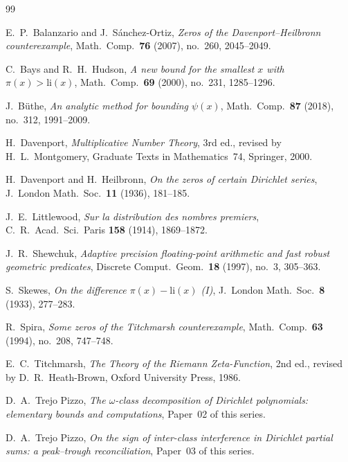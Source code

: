 \documentclass[11pt]{amsart}
\theoremstyle{definition}
\theoremstyle{remark}
\begin{document}
\begin{thebibliography}{99}

E.~P.\ Balanzario and J.~S\'anchez-Ortiz,
\emph{Zeros of the Davenport--Heilbronn counterexample},
Math.\ Comp.\ \textbf{76} (2007), no.\ 260, 2045--2049.

C.~Bays and R.~H.\ Hudson,
\emph{A new bound for the smallest $x$ with $\pi(x)>\mathrm{li}(x)$},
Math.\ Comp.\ \textbf{69} (2000), no.\ 231, 1285--1296.

J.~B\"uthe,
\emph{An analytic method for bounding $\psi(x)$},
Math.\ Comp.\ \textbf{87} (2018), no.\ 312, 1991--2009.

H.~Davenport,
\emph{Multiplicative Number Theory},
3rd ed., revised by H.~L.~Montgomery,
Graduate Texts in Mathematics~74, Springer, 2000.

H.~Davenport and H.~Heilbronn,
\emph{On the zeros of certain Dirichlet series},
J.\ London Math.\ Soc.\ \textbf{11} (1936), 181--185.

J.~E.\ Littlewood,
\emph{Sur la distribution des nombres premiers},
C.\ R.\ Acad.\ Sci.\ Paris \textbf{158} (1914), 1869--1872.

J.~R.\ Shewchuk,
\emph{Adaptive precision floating-point arithmetic and fast robust
geometric predicates},
Discrete Comput.\ Geom.\ \textbf{18} (1997), no.~3, 305--363.

S.~Skewes,
\emph{On the difference $\pi(x)-\mathrm{li}(x)$ (I)},
J.\ London Math.\ Soc.\ \textbf{8} (1933), 277--283.

R.~Spira,
\emph{Some zeros of the Titchmarsh counterexample},
Math.\ Comp.\ \textbf{63} (1994), no.\ 208, 747--748.

E.~C.\ Titchmarsh,
\emph{The Theory of the Riemann Zeta-Function},
2nd ed., revised by D.~R.~Heath-Brown,
Oxford University Press, 1986.

D.~A.\ Trejo Pizzo,
\emph{The $\omega$-class decomposition of Dirichlet polynomials:
elementary bounds and computations},
Paper~02 of this series.

D.~A.\ Trejo Pizzo,
\emph{On the sign of inter-class interference in Dirichlet partial sums:
a peak--trough reconciliation},
Paper~03 of this series.

\end{thebibliography}
\end{document}
